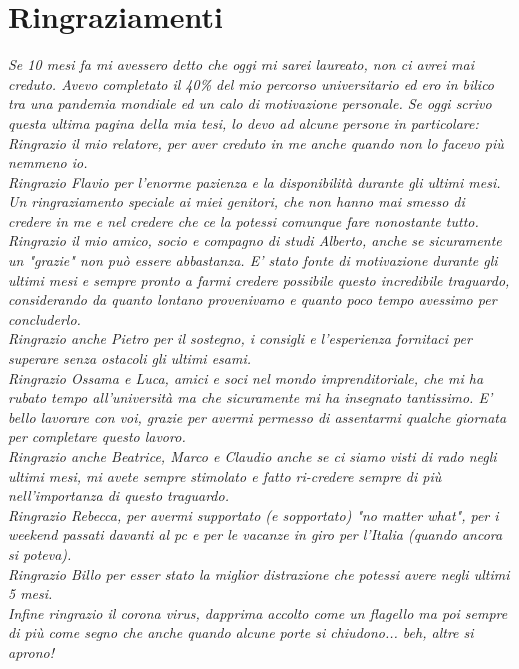 \chapter*{Ringraziamenti}
\thispagestyle{empty}
\begin{flushright}
	\textit{Se 10 mesi fa mi avessero detto che oggi mi sarei laureato, non ci avrei mai creduto. Avevo completato il 40\% del mio percorso universitario ed ero in bilico tra una pandemia mondiale ed un calo di motivazione personale.
	Se oggi scrivo questa ultima pagina della mia tesi, lo devo ad alcune persone in particolare:\\	
		 Ringrazio il mio relatore, per aver creduto in me anche quando non lo facevo più nemmeno io.\\Ringrazio {\normalfont Flavio} per l'enorme pazienza e la disponibilità durante gli ultimi mesi.\\Un ringraziamento speciale ai miei genitori, che non hanno mai smesso di credere in me e nel credere che ce la potessi comunque fare nonostante tutto.\\
		 Ringrazio il mio amico, socio e compagno di studi {\normalfont Alberto}, anche se sicuramente un "grazie" non può essere abbastanza. E' stato fonte di motivazione durante gli ultimi mesi e sempre pronto a farmi credere possibile questo incredibile traguardo, considerando da quanto lontano provenivamo e quanto poco tempo avessimo per concluderlo.\\
		 Ringrazio anche {\normalfont Pietro} per il sostegno, i consigli e l'esperienza fornitaci per superare senza ostacoli gli ultimi esami.\\
		Ringrazio {\normalfont Ossama} e {\normalfont Luca}, amici e soci nel mondo imprenditoriale, che mi ha rubato tempo all'università ma che sicuramente mi ha insegnato tantissimo. E' bello lavorare con voi, grazie per avermi permesso di assentarmi qualche giornata per completare questo lavoro.\\
		Ringrazio anche {\normalfont Beatrice}, {\normalfont Marco} e {\normalfont Claudio} anche se ci siamo visti di rado negli ultimi mesi, mi avete sempre stimolato e fatto ri-credere sempre di più nell'importanza di questo traguardo.\\
		Ringrazio {\normalfont Rebecca}, per avermi supportato (e sopportato) "no matter what", per i weekend passati davanti al pc e per le vacanze in giro per l'Italia (quando ancora si poteva).\\
		Ringrazio {\normalfont Billo} per esser stato la miglior distrazione che potessi avere negli ultimi 5 mesi.\\
		Infine ringrazio il corona virus, dapprima accolto come un flagello ma poi sempre di più come segno che anche quando alcune porte si chiudono... beh, altre si aprono!}
\end{flushright}
